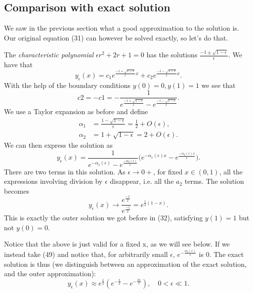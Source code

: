 \documentclass[12pt]{article}
\begin{document}
\subsection{Comparison with exact solution}

We saw in the previous section what a good approximation to the
solution is. Our original equation (31) can however be solved exactly,
so let's do that.

The \textit{characteristic polynomial} $\epsilon r^2 +2r + 1 = 0$ has
the solutions $\frac{-1 \pm \sqrt{1-\epsilon}}{\epsilon}$. We have
that
\begin{equation}
y_{\epsilon}(x)=c_1 e^{\frac{-1 + \sqrt{1-\epsilon}}{\epsilon} x} + c_2
e^{\frac{-1 - \sqrt{1-\epsilon}}{\epsilon} x}.
\end{equation}
With the help of the boundary conditions $y(0)=0, y(1)=1$ we see that
\begin{equation}
  c2 = - c1 = - \frac{1}{e^{\frac{-1 + \sqrt{1-\epsilon}}{\epsilon}}
    - e^{\frac{-1 - \sqrt{1-\epsilon}}{\epsilon}}}.
\end{equation}
We use a Taylor expansion as before and define
\begin{align}
  \alpha_1 &= \frac{1 - \sqrt{1-\epsilon}}{\epsilon} = \frac{1}{2} + O(\epsilon), \\
  \alpha_2 &= 1+ \sqrt{1-\epsilon} = 2 + O(\epsilon).
\end{align}
We can then express the solution as
\begin{equation}
  y_{\epsilon}(x) = \frac{1}{e^{-\alpha_1(\epsilon)} - e^{\frac{-\alpha_2(\epsilon)}{\epsilon}}} \Big(e^{-\alpha_1(\epsilon)x} - e^{\frac{-\alpha_2(\epsilon)x}{\epsilon}}\Big).
\end{equation}
There are two terms in this solution. As $\epsilon \to 0+$, for fixed
$x \in (0,1)$, all the expressions involving division by $\epsilon$
disappear, i.e. all the $a_2$ terms. The solution becomes
\begin{equation}
  y_{\epsilon}(x) \to \frac{e^{\frac{-x}{2}}}{e^{\frac{-1}{2}}} = e^{\frac{1}{2}(1-x)}.
\end{equation}
This is exactly the outer solution we got before in (32), satisfying
$y(1)=1$ but not $y(0)=0$.

Notice that the above is just valid for a fixed x, as we will see
below. If we instead take (49) and notice that, for arbitrarily small
$\epsilon$, $e^{-\frac{\alpha_2(\epsilon)}{\epsilon}}$ is 0. The exact
solution is thus (we distinguish between an approximation of the exact
solution, and the outer approximation):
\begin{equation}
  y_{\epsilon}(x) \approx e^{\frac{1}{2}}(e^{-\frac{x}{2}} -
  e^{-\frac{2x}{\epsilon}}), \quad 0 < \epsilon \ll 1.
\end{equation}
\end{document}

